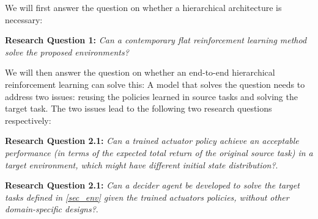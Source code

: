 We will first answer the question on whether a hierarchical architecture is necessary: 

\textbf{Research Question 1: }\textit{Can a contemporary flat reinforcement learning method solve the proposed environments?}


We will then answer the question on whether an end-to-end hierarchical reinforcement learning can solve this:
A model that solves the question needs to address two issues: reusing the policies learned in source tasks and solving the target task. The two issues lead to the following two research questions respectively:

\textbf{Research Question 2.1: }\textit{Can a trained actuator policy achieve an acceptable performance (in terms of the expected total return of the original source task) in a target environment, which might have different initial state distribution?}.

\textbf{Research Question 2.1: }\textit{Can a decider agent be developed to solve the target tasks defined in \ref{sec_env} given the trained actuators policies, without other domain-specific designs?}.

